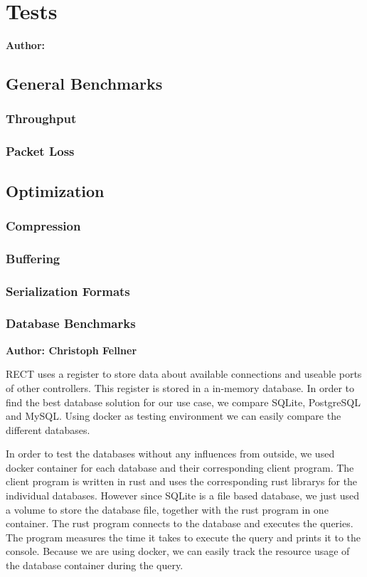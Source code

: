 \chapter{Tests}

\textbf{Author: }

\section{General Benchmarks}
\subsection{Throughput}
\subsection{Packet Loss}

\section{Optimization}
\subsection{Compression}
\subsection{Buffering}
\subsection{Serialization Formats}

\subsection{Database Benchmarks}
\textbf{Author: Christoph Fellner}

RECT uses a register to store data about available connections and useable ports of other controllers. This register is stored in a in-memory database. In order to find the 
best database solution for our use case, we compare SQLite, PostgreSQL and MySQL. Using docker as testing environment we can easily compare the different databases.

In order to test the databases without any influences from outside, we used docker container for each database and their corresponding client program. The client program
is written in rust and uses the corresponding rust librarys for the individual databases. However since SQLite is a file based database, we just used a volume to store the
database file, together with the rust program in one container. The rust program connects to the database and executes the queries. The program measures the time it 
takes to execute the query and prints it to the console. Because we are using docker, we can easily track the resource usage of the database container during the query. 

\filbreak